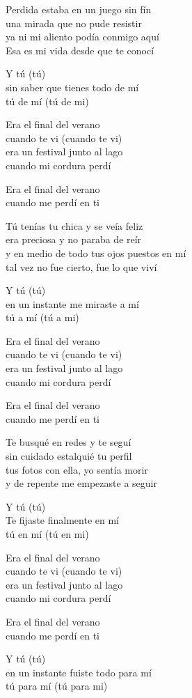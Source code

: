 \begin{lyrics}
Perdida estaba en un juego sin fín\\
una mirada que no pude resistir\\
ya ni mi aliento podía conmigo aquí\\
Esa es mi vida desde que te conocí

Y tú (tú)\\
sin saber que tienes todo de mí\\
tú de mí (tú de mi)

Era el final del verano\\
cuando te vi (cuando te vi)\\
era un festival junto al lago\\
cuando mi cordura perdí

Era el final del verano\\
cuando me perdí en ti

Tú tenías tu chica y se veía feliz\\
era preciosa y no paraba de reír\\
y en medio de todo tus ojos puestos en mí\\
tal vez no fue cierto, fue lo que viví

Y tú (tú)\\
en un instante me miraste a mí\\
tú a mí (tú a mi)

Era el final del verano\\
cuando te vi (cuando te vi)\\
era un festival junto al lago\\
cuando mi cordura perdí

Era el final del verano\\
cuando me perdí en ti

Te busqué en redes y te seguí\\
sin cuidado estalquié tu perfil\\
tus fotos con ella, yo sentía morir\\
y de repente me empezaste a seguir

Y tú (tú)\\
Te fijaste finalmente en mí\\
tú en mí (tú en mi)

Era el final del verano\\
cuando te vi (cuando te vi)\\
era un festival junto al lago\\
cuando mi cordura perdí

Era el final del verano\\
cuando me perdí en ti

Y tú (tú)\\
en un instante fuiste todo para mí\\
tú para mí (tú para mi)
\end{lyrics}

